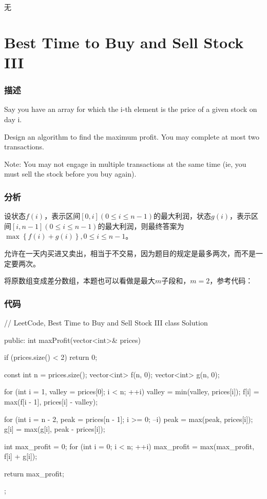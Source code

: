 \begindot
\item 无
\myenddot


\section{Best Time to Buy and Sell Stock III} %
\label{sec:best-time-to-buy-and-sell-stock-iii}


\subsubsection{描述}
Say you have an array for which the i-th element is the price of a given stock on day i.

Design an algorithm to find the maximum profit. You may complete at most two transactions.

Note: You may not engage in multiple transactions at the same time (ie, you must sell the stock before you buy again).


\subsubsection{分析}
设状态$f(i)$，表示区间$[0,i](0 \leq i \leq n-1)$的最大利润，状态$g(i)$，表示区间$[i, n-1](0 \leq i \leq n-1)$的最大利润，则最终答案为$\max\left\{f(i)+g(i)\right\},0 \leq i \leq n-1$。

允许在一天内买进又卖出，相当于不交易，因为题目的规定是最多两次，而不是一定要两次。

将原数组变成差分数组，本题也可以看做是最大$m$子段和，$m=2$，参考代码：

\subsubsection{代码}
\begin{Code}
// LeetCode, Best Time to Buy and Sell Stock III
class Solution {
public:
    int maxProfit(vector<int>& prices) {
        if (prices.size() < 2) return 0;

        const int n = prices.size();
        vector<int> f(n, 0);
        vector<int> g(n, 0);

        for (int i = 1, valley = prices[0]; i < n; ++i) {
            valley = min(valley, prices[i]);
            f[i] = max(f[i - 1], prices[i] - valley);
        }

        for (int i = n - 2, peak = prices[n - 1]; i >= 0; --i) {
            peak = max(peak, prices[i]);
            g[i] = max(g[i], peak - prices[i]);
        }

        int max_profit = 0;
        for (int i = 0; i < n; ++i)
            max_profit = max(max_profit, f[i] + g[i]);

        return max_profit;
    }
};
\end{Code}


